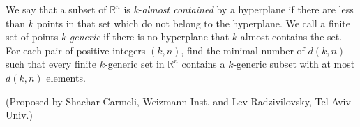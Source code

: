 We say that a subset of $\mathbb{R}^n$ is $k$-\textit{almost contained} by a hyperplane if there are less than $k$ points in that set which do not belong to the hyperplane. We call a finite set of points $k$-\textit{generic} if there is no hyperplane that $k$-almost contains the set. For each pair of positive integers $(k, n)$, find the minimal number of $d(k, n)$ such that every finite $k$-generic set in $\mathbb{R}^n$ contains a $k$-generic subset with at most $d(k, n)$ elements.

(Proposed by Shachar Carmeli, Weizmann Inst. and Lev Radzivilovsky, Tel Aviv Univ.)